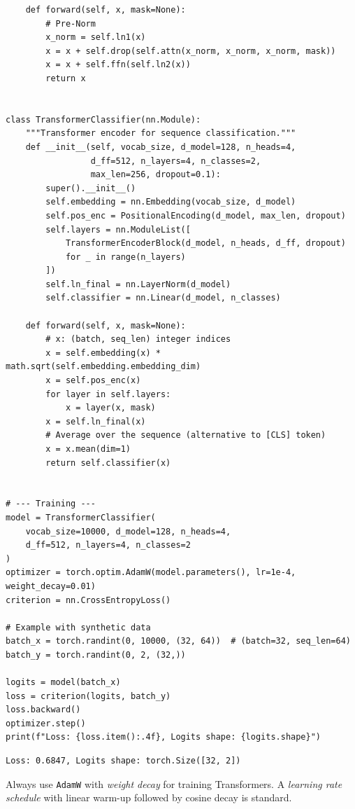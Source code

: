 \begin{codeblock}[title=\textbf{Complete Transformer for sequence classification}]
\begin{verbatim}
    def forward(self, x, mask=None):
        # Pre-Norm
        x_norm = self.ln1(x)
        x = x + self.drop(self.attn(x_norm, x_norm, x_norm, mask))
        x = x + self.ffn(self.ln2(x))
        return x


class TransformerClassifier(nn.Module):
    """Transformer encoder for sequence classification."""
    def __init__(self, vocab_size, d_model=128, n_heads=4,
                 d_ff=512, n_layers=4, n_classes=2,
                 max_len=256, dropout=0.1):
        super().__init__()
        self.embedding = nn.Embedding(vocab_size, d_model)
        self.pos_enc = PositionalEncoding(d_model, max_len, dropout)
        self.layers = nn.ModuleList([
            TransformerEncoderBlock(d_model, n_heads, d_ff, dropout)
            for _ in range(n_layers)
        ])
        self.ln_final = nn.LayerNorm(d_model)
        self.classifier = nn.Linear(d_model, n_classes)

    def forward(self, x, mask=None):
        # x: (batch, seq_len) integer indices
        x = self.embedding(x) * math.sqrt(self.embedding.embedding_dim)
        x = self.pos_enc(x)
        for layer in self.layers:
            x = layer(x, mask)
        x = self.ln_final(x)
        # Average over the sequence (alternative to [CLS] token)
        x = x.mean(dim=1)
        return self.classifier(x)


# --- Training ---
model = TransformerClassifier(
    vocab_size=10000, d_model=128, n_heads=4,
    d_ff=512, n_layers=4, n_classes=2
)
optimizer = torch.optim.AdamW(model.parameters(), lr=1e-4, weight_decay=0.01)
criterion = nn.CrossEntropyLoss()

# Example with synthetic data
batch_x = torch.randint(0, 10000, (32, 64))  # (batch=32, seq_len=64)
batch_y = torch.randint(0, 2, (32,))

logits = model(batch_x)
loss = criterion(logits, batch_y)
loss.backward()
optimizer.step()
print(f"Loss: {loss.item():.4f}, Logits shape: {logits.shape}")
\end{verbatim}
\end{codeblock}

\begin{codeoutput}
\begin{verbatim}
Loss: 0.6847, Logits shape: torch.Size([32, 2])
\end{verbatim}
\end{codeoutput}

\begin{bestpractice}
Always use \texttt{AdamW} with \emph{weight decay} for training Transformers. A \emph{learning rate schedule} with linear warm-up followed by cosine decay is standard.
\end{bestpractice}

